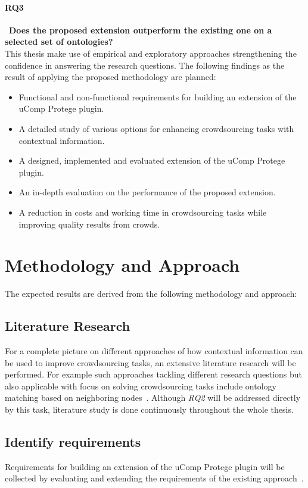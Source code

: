 \documentclass[12pt, notitlepage]{article}
\begin{document}
\paragraph{RQ3}~\textbf{Does the proposed extension outperform the existing one on a selected set of ontologies?}\\
This thesis make use of empirical and exploratory approaches strengthening the confidence in answering the research questions. The following findings as the result of applying the proposed methodology are planned:
\begin{itemize}
	\item Functional and non-functional requirements for building an extension of the uComp Protege plugin.
	\item A detailed study of various options for enhancing crowdsourcing tasks with contextual information.
	\item A designed, implemented and evaluated extension of the uComp Protege plugin.
	\item An in-depth evaluation on the performance of the proposed extension.
	\item A reduction in costs and working time in crowdsourcing tasks while improving quality results from crowds.
\end{itemize}
\section{Methodology and Approach}
The expected results are derived from the following methodology and approach:
\subsection{Literature Research}
For a complete picture on different approaches of how contextual information can be used to improve crowdsourcing tasks, an extensive literature research will be performed. For example such approaches tackling different research questions but also applicable with focus on solving crowdsourcing tasks include ontology matching based on neighboring nodes~\cite{hoffmann2010context}. Although \emph{RQ2} will be addressed directly by this task, literature study is done continuously throughout the whole thesis. 
\subsection{Identify requirements}
Requirements for building an extension of the uComp Protege plugin will be collected by evaluating and extending the requirements of the existing approach~\cite{wohlgenannt2016crowd}. 
\end{document}

